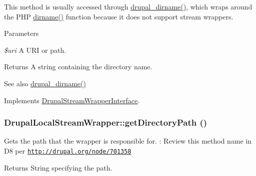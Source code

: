 This method is usually accessed through \hyperlink{group__php__wrappers_gad00418a5880c03f43e5eccfaa62863f6}{drupal\_\-dirname()}, which wraps around the PHP \hyperlink{classDrupalLocalStreamWrapper_ab98ad39ce1745a24c760abf3e4297577}{dirname()} function because it does not support stream wrappers.


\begin{DoxyParams}{Parameters}
\item[{\em \$uri}]A URI or path.\end{DoxyParams}
\begin{DoxyReturn}{Returns}
A string containing the directory name.
\end{DoxyReturn}
\begin{DoxySeeAlso}{See also}
\hyperlink{group__php__wrappers_gad00418a5880c03f43e5eccfaa62863f6}{drupal\_\-dirname()} 
\end{DoxySeeAlso}


Implements \hyperlink{interfaceDrupalStreamWrapperInterface_a4d189eb40075b3873752c7706e41aac6}{DrupalStreamWrapperInterface}.\hypertarget{classDrupalLocalStreamWrapper_a3ff87a4643479303f4880f2381d0f432}{
\subsubsection[{getDirectoryPath}]{\setlength{\rightskip}{0pt plus 5cm}DrupalLocalStreamWrapper::getDirectoryPath ()}}
\label{classDrupalLocalStreamWrapper_a3ff87a4643479303f4880f2381d0f432}
Gets the path that the wrapper is responsible for. : Review this method name in D8 per \href{http://drupal.org/node/701358}{\tt http://drupal.org/node/701358}

\begin{DoxyReturn}{Returns}
String specifying the path. 
\end{DoxyReturn}


